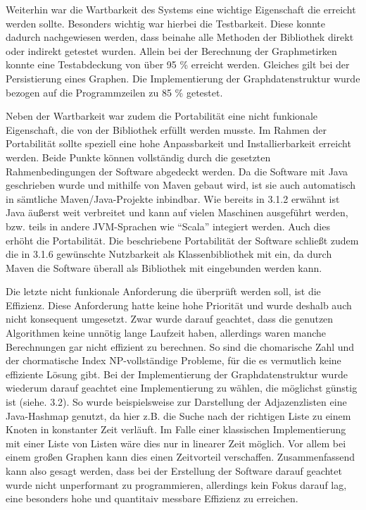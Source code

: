 \documentclass[a4paper,12pt,ngerman,chapterprefix=false,listof=totoc,bibliography=totoc]{scrreprt}
\begin{document}
{{{Weiterhin war die Wartbarkeit des Systems eine wichtige Eigenschaft die erreicht werden sollte. Besonders wichtig war hierbei die Testbarkeit. Diese konnte dadurch nachgewiesen werden, dass beinahe alle Methoden der Bibliothek direkt oder indirekt getestet wurden. Allein bei der Berechnung der Graphmetirken konnte eine Testabdeckung von über 95 \% erreicht werden. Gleiches gilt bei der Persistierung eines Graphen. Die Implementierung der Graphdatenstruktur wurde bezogen auf die Programmzeilen zu 85 \% getestet. 

Neben der Wartbarkeit war zudem die Portabilität eine nicht funkionale Eigenschaft, die von der Bibliothek erfüllt werden musste. Im Rahmen der Portabilität sollte speziell eine hohe Anpassbarkeit und Installierbarkeit erreicht werden. Beide Punkte können vollständig durch die gesetzten Rahmenbedingungen der Software abgedeckt werden. Da die Software mit Java geschrieben wurde und mithilfe von Maven gebaut wird, ist sie auch automatisch in sämtliche Maven/Java-Projekte inbindbar. Wie bereits in 3.1.2 erwähnt ist Java äußerst weit verbreitet und kann auf vielen Maschinen ausgeführt werden, bzw. teils in andere JVM-Sprachen wie "`Scala"' integiert werden. \cite{ullenboom_java_2016} Auch dies erhöht die Portabilität. Die beschriebene Portabilität der Software schließt zudem die in 3.1.6 gewünschte Nutzbarkeit als Klassenbibliothek mit ein, da durch Maven die Software überall als Bibliothek mit eingebunden werden kann.

Die letzte nicht funkionale Anforderung die überprüft werden soll, ist die Effizienz. Diese Anforderung hatte keine hohe Priorität und wurde deshalb auch nicht konsequent umgesetzt. Zwar wurde darauf geachtet, dass die genutzen Algorithmen keine unnötig lange Laufzeit haben, allerdings waren manche Berechnungen gar nicht effizient zu berechnen. So sind die chomarische Zahl und der chormatische Index NP-vollständige Probleme, für die es vermutlich keine effiziente Lösung gibt. Bei der Implementierung der Graphdatenstruktur wurde wiederum darauf geachtet eine Implementierung zu wählen, die möglichst günstig ist (siehe. 3.2). So wurde beispielsweise zur Darstellung der Adjazenzlisten eine Java-Hashmap genutzt, da hier z.B. die Suche nach der richtigen Liste zu einem Knoten in konstanter Zeit verläuft. Im Falle einer klassischen Implementierung mit einer Liste von Listen wäre dies nur in linearer Zeit möglich. Vor allem bei einem großen Graphen kann dies einen Zeitvorteil verschaffen. Zusammenfassend kann also gesagt werden, dass bei der Erstellung der Software darauf geachtet wurde nicht unperformant zu programmieren, allerdings kein Fokus darauf lag, eine besonders hohe und quantitaiv messbare Effizienz zu erreichen.
}
}}
\end{document}
